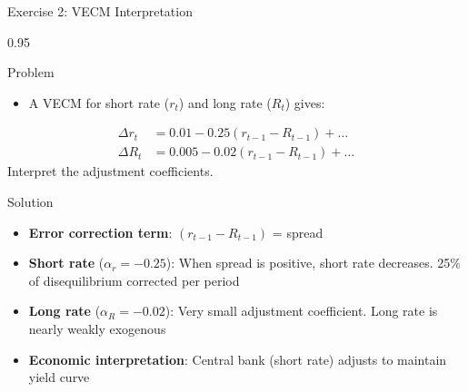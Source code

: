 \documentclass[9pt, aspectratio=169, t]{beamer}
\begin{document}
\begin{frame}{Exercise 2: VECM Interpretation}
    \begin{cminipage}{0.95\textwidth}
    \begin{alertblock}{Problem}
        \begin{itemize}\setlength{\itemsep}{0pt}
            \item A VECM for short rate ($r_t$) and long rate ($R_t$) gives:
        \end{itemize}
        \begin{align*}
            \Delta r_t &= 0.01 - 0.25(r_{t-1} - R_{t-1}) + \ldots \\
            \Delta R_t &= 0.005 - 0.02(r_{t-1} - R_{t-1}) + \ldots
        \end{align*}
        Interpret the adjustment coefficients.
    \end{alertblock}

    \vspace{0.2cm}
    \begin{exampleblock}{Solution}
        \begin{itemize}\setlength{\itemsep}{0pt}
            \item \textbf{Error correction term}: $(r_{t-1} - R_{t-1})$ = spread
            \item \textbf{Short rate} ($\alpha_r = -0.25$): When spread is positive, short rate decreases. 25\% of disequilibrium corrected per period
            \item \textbf{Long rate} ($\alpha_R = -0.02$): Very small adjustment coefficient. Long rate is nearly weakly exogenous
            \item \textbf{Economic interpretation}: Central bank (short rate) adjusts to maintain yield curve
        \end{itemize}
    \end{exampleblock}
    \end{cminipage}
\end{frame}
\end{document}
